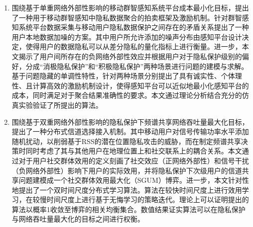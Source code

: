 \begin{enumerate}
     \item 围绕基于单重网络外部性影响的移动群智感知系统平台成本最小化目标，提出了一种用于移动群智感知中隐私数据聚合的拍卖框架及激励机制。针对群智感知系统平台数据采集与移动用户隐私数据保护之间存在的矛盾关系提出了一种用户本地数据加噪的方案。其中用户所允许添加的噪声分布由感知平台设计决定，使得用户的数据隐私可以从差分隐私的量化指标上进行衡量。进一步，本文揭示了用户间所存在的负网络外部性效应并根据用户对于隐私保护级别的偏好，分成“消极隐私保护”和“积极隐私保护”两种场景进行问题的建模与求解。基于问题隐藏的单调性特性，针对两种场景分别提出了具有诚实性、个体理性、且计算高效的激励机制设计，使得感知平台可以近似地最小化感知平台的成本，同时满足对于聚合结果准确性的要求。本文通过理论分析结合充分的仿真实验验证了所提出的算法。

   \item 围绕基于双重网络外部性影响的隐私保护下频谱共享网络吞吐量最大化目标，提出了一种分布式信道选择接入机制。其中移动用户对信号传输功率水平添加随机扰动，以削弱基于RSS的潜在位置隐私攻击的威胁，而在制定频谱共享决策时同时考虑了其与其他用户在地理位置上和社交联系上的耦合关系。本文通过对于用户社交群体效用的定义刻画了社交效应（正网络外部性）和信号干扰（负网络外部性）影响下用户的实际效用，并将隐私保护下次级用户的信道共享问题建模成一个社交群体效用最大化（SGUM）博弈。进一步，本文针对性地提出了一个双时间尺度分布式学习算法。算法在较快时间尺度上进行效用学习，在较慢时间尺度上进行基于无悔学习的策略迭代。理论上可以证明提出的算法以概率1收敛至博弈的相关均衡集合。数值结果证实算法可以在隐私保护与网络吞吐量最大化的目标之间进行权衡。
   

\end{enumerate}
